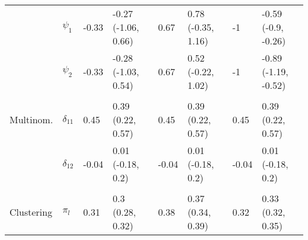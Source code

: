 \documentclass[]{article}
\begin{document}
\begin{table}[t]
\begin{tabular}{llllllll}
\hspace{1em} & $\psi_{1}$ & -0.33 & -0.27 (-1.06, 0.66) & 0.67 & 0.78 (-0.35, 1.16) & -1 & -0.59 (-0.9, -0.26)\\
\hspace{1em} & $\psi_{2}$ & -0.33 & -0.28 (-1.03, 0.54) & 0.67 & 0.52 (-0.22, 1.02) & -1 & -0.89 (-1.19, -0.52)\\
\addlinespace[0.3em]
\multicolumn{8}{l}{\textbf{ }}\\
\hspace{1em}\hspace{1em}Multinom. & $\delta_{11}$ & 0.45 & 0.39 (0.22, 0.57) & 0.45 & 0.39 (0.22, 0.57) & 0.45 & 0.39 (0.22, 0.57)\\
 & $\delta_{12}$ & -0.04 & 0.01 (-0.18, 0.2) & -0.04 & 0.01 (-0.18, 0.2) & -0.04 & 0.01 (-0.18, 0.2)\\
\addlinespace[0.3em]
\multicolumn{8}{l}{\textbf{ }}\\
\hspace{1em}Clustering & $\pi_l$ & 0.31 & 0.3 (0.28, 0.32) & 0.38 & 0.37 (0.34, 0.39) & 0.32 & 0.33 (0.32, 0.35)\\
\bottomrule
\end{tabular}
\end{table}
\end{document}
